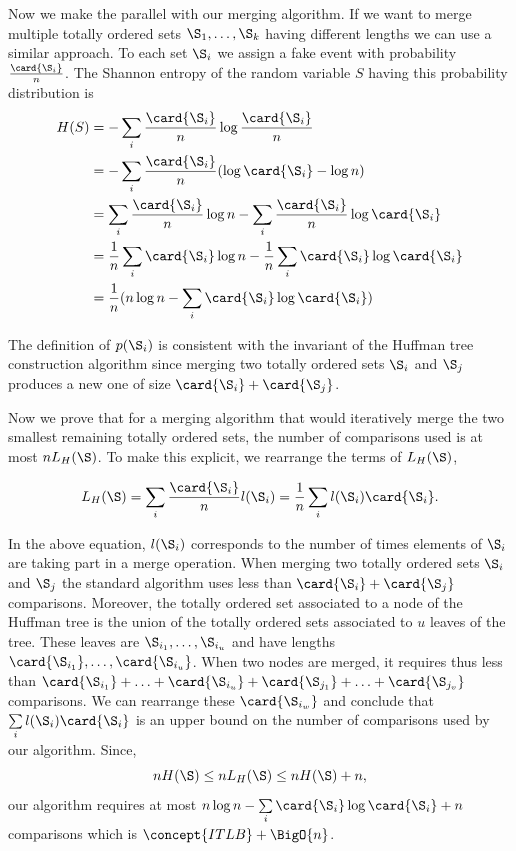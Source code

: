 Now we make the parallel with our merging algorithm. If we want to merge
multiple totally ordered sets \(\S_1,\ldots,\S_k\) having different lengths we can use a similar
approach. To each set \(\S_i\) we assign a fake event with probability
\(\frac{\card{\S_i}}{n}\). The Shannon entropy of the random variable
\(S\) having this probability distribution is
\begin{align}
H(S) &= - \sum_i \frac{\card{\S_i}}{n} \log \frac{\card{\S_i}}{n}\\
&= - \sum_i \frac{\card{\S_i}}{n} (\log \card{\S_i} - \log n)\\
&= \sum_i \frac{\card{\S_i}}{n} \log n - \sum_i \frac{\card{\S_i}}{n} \log \card{\S_i}\\
&= \frac{1}{n} \sum_i \card{\S_i} \log n - \frac{1}{n} \sum_i \card{\S_i} \log
\card{\S_i}\\
&= \frac{1}{n} (n \log n - \sum_i \card{\S_i} \log \card{\S_i})
\end{align}

The definition of \(p(\S_i)\) is consistent with the invariant of
the Huffman tree construction algorithm since merging two totally ordered sets
\(\S_i\) and \(\S_j\) produces a new one of size \(\card{\S_i} + \card{\S_j}\).

Now we prove that for a merging algorithm that would iteratively merge the two
smallest remaining totally ordered sets, the number of comparisons used is at
most \(n L_H(\S)\). To make this explicit, we rearrange the terms of \(L_H(\S)\),

\begin{displaymath}
L_H(\S) = \sum_i \frac{\card{\S_i}}{n} l(\S_i) = \frac{1}{n} \sum_i l(\S_i) \card{\S_i}.
\end{displaymath}

In the above equation, \(l(\S_i)\) corresponds to the number of times elements
of \(\S_i\) are taking part in a merge operation. When merging two totally
ordered sets \(\S_i\) and \(\S_j\) the standard \tapemerge algorithm uses less
than \(\card{\S_i} + \card{\S_j}\) comparisons. Moreover, the totally ordered set
associated to a node of the Huffman tree is the union of the totally ordered
sets associated to \(u\) leaves of the tree. These leaves are
\(\S_{i_1},\ldots,\S_{i_u}\) and have lengths
\(\card{\S_{i_1}},\ldots,\card{\S_{i_u}}\). When two nodes are merged, it
requires thus less than
\(\card{\S_{i_1}}+\ldots+\card{\S_{i_u}}+\card{\S_{j_1}}+\ldots+\card{\S_{j_v}}\)
comparisons. We can rearrange these \(\card{\S_{i_w}}\) and conclude that
\(\sum\limits_i l(\S_i) \card{\S_i}\) is an upper bound on the number of comparisons used
by our algorithm. Since,
\begin{displaymath}
n H(\S) \le n L_H(\S) \le n H(\S) + n,
\end{displaymath}
our algorithm requires at most \(n \log n - \sum\limits_i \card{\S_i} \log \card{\S_i} +
n\) comparisons which is \(\concept{ITLB} + \BigO{n}\).

